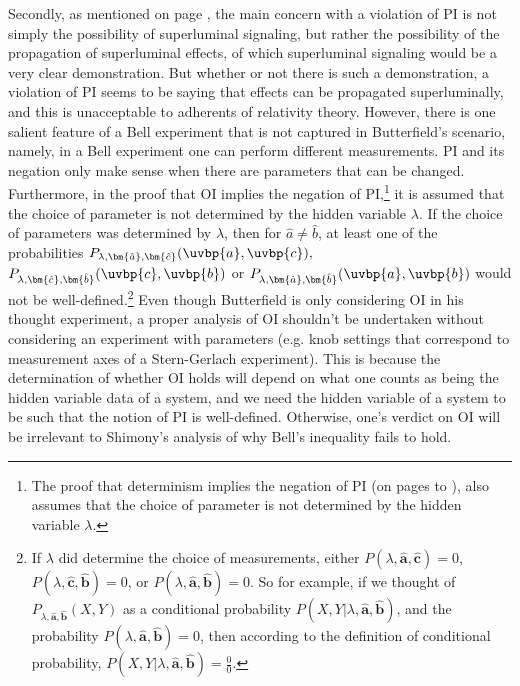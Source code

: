 \documentclass[12pt]{report}
\begin{document}
{Secondly, as mentioned on page \pageref{lambdaknowledge}, the main concern with a violation of PI is not simply the possibility of superluminal signaling, but rather the possibility of the propagation of superluminal effects, of which superluminal signaling would be a very clear demonstration. But whether or not there is such a demonstration, a violation of PI seems to be saying that effects can be propagated superluminally, and this is unacceptable to adherents of relativity theory.} However, there is one salient feature of a Bell experiment that is not captured in Butterfield's scenario, namely, in a Bell experiment  one can perform different measurements.  PI and its negation only make sense when there are parameters that can be changed. Furthermore, in the proof that OI implies the negation of PI,\footnote{The proof  that determinism implies the negation of PI (on pages \pageref{bellinequality2} to \pageref{PIdeterminism}), also assumes that the choice of parameter is not determined by the hidden variable $\lambda$.} it is assumed that the choice of parameter is not determined by the hidden variable $\lambda$. If the choice of parameters was determined by $\lambda$, then for $\hat{a}\neq\hat{b}$, at least one of the probabilities $P_{\lambda,\bm{\hat{a}},\bm{\hat{c}}}(\uvbp{a},\uvbp{c}),$ $P_{\lambda,\bm{\hat{c}},\bm{\hat{b}}}(\uvbp{c},\uvbp{b})$ or $P_{\lambda,\bm{\hat{a}},\bm{\hat{b}}}(\uvbp{a},\uvbp{b})$ would not be well-defined.\footnote{If $\lambda$ \label{lambdadetermineprob} did determine the choice of measurements, either $P(\lambda,\bm{\hat{a}},\bm{\hat{c}})=0$, $P(\lambda,\bm{\hat{c}},\bm{\hat{b}})=0$, or $P(\lambda,\bm{\hat{a}},\bm{\hat{b}})=0$. So for example, if we thought of $P_{\lambda,\bm{\hat{a}},\bm{\hat{b}}}(X,Y)$ as a conditional probability $P(X,Y|\lambda,\bm{\hat{a}},\bm{\hat{b}})$, and the probability $P(\lambda,\bm{\hat{a}},\bm{\hat{b}})=0$, then according to the definition of conditional probability,  $P(X,Y|\lambda,\bm{\hat{a}},\bm{\hat{b}})=\frac{0}{0}.$} Even though Butterfield is only considering OI in his thought experiment, a proper analysis of OI shouldn't be undertaken without considering an experiment with parameters (e.g. knob settings that correspond to measurement axes of a Stern-Gerlach experiment). This is because the determination of whether OI holds will depend on what one counts as being the hidden variable data of a system, and we need the hidden variable of a system to be such that the notion of PI is well-defined. Otherwise, one's verdict on OI will be irrelevant to Shimony's analysis of why Bell's inequality fails to hold. 
\end{document}
